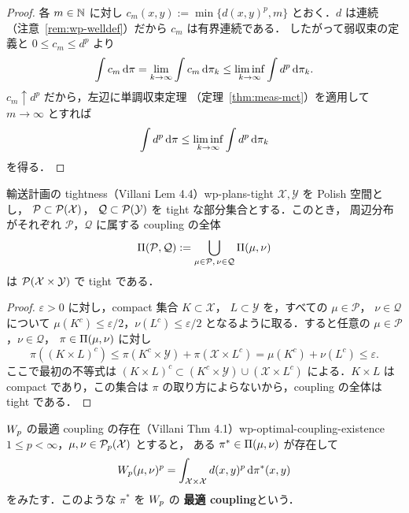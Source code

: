 \begin{proof}
  各 $m\in\mathbb{N}$ に対し $c_m(x,y):=\min\{d(x,y)^p,m\}$ とおく．$d$ は連続
  （注意~\ref{rem:wp-welldef}）だから $c_m$ は有界連続である．
  したがって弱収束の定義と $0\leq c_m\leq d^p$ より
  \[
    \int c_m\,\mathrm{d}\pi
    =\lim_{k\to\infty}\int c_m\,\mathrm{d}\pi_k
    \leq\liminf_{k\to\infty}\int d^p\,\mathrm{d}\pi_k.
  \]
  $c_m\uparrow d^p$ だから，左辺に単調収束定理
  （定理~\ref{thm:meas-mct}）を適用して $m\to\infty$ とすれば
  \[
    \int d^p\,\mathrm{d}\pi
    \leq\liminf_{k\to\infty}\int d^p\,\mathrm{d}\pi_k
  \]
  を得る．
\end{proof}

\begin{lemma}{輸送計画の tightness（Villani Lem 4.4）}{wp-plans-tight}
  $\mathcal{X},\mathcal{Y}$ を Polish 空間とし，
  $\mathcal{P}\subset\mathcal{P}(\mathcal{X})$，
  $\mathcal{Q}\subset\mathcal{P}(\mathcal{Y})$ を
  tight な部分集合とする．このとき，
  周辺分布がそれぞれ $\mathcal{P}$，$\mathcal{Q}$ に属する
  coupling の全体
  \[
    \Pi(\mathcal{P},\mathcal{Q})
    :=\bigcup_{\mu\in\mathcal{P},\,\nu\in\mathcal{Q}}
    \Pi(\mu,\nu)
  \]
  は $\mathcal{P}(\mathcal{X}\times\mathcal{Y})$ で tight である．
\end{lemma}

\begin{proof}
  $\varepsilon>0$ に対し，compact 集合 $K\subset\mathcal{X}$，
  $L\subset\mathcal{Y}$ を，すべての $\mu\in\mathcal{P}$，
  $\nu\in\mathcal{Q}$ について
  $\mu(K^c)\leq\varepsilon/2$，$\nu(L^c)\leq\varepsilon/2$
  となるように取る．すると任意の $\mu\in\mathcal{P}$，$\nu\in\mathcal{Q}$，
  $\pi\in\Pi(\mu,\nu)$ に対し
  \[
    \pi((K\times L)^c)
    \leq
    \pi(K^c\times\mathcal{Y})+\pi(\mathcal{X}\times L^c)
    =\mu(K^c)+\nu(L^c)\leq\varepsilon.
  \]
  ここで最初の不等式は
  $(K\times L)^c\subset(K^c\times\mathcal{Y})\cup(\mathcal{X}\times L^c)$
  による．$K\times L$ は compact であり，この集合は
  $\pi$ の取り方によらないから，coupling の全体は tight である．
\end{proof}

\begin{theorem}{$W_p$ の最適 coupling の存在（Villani Thm 4.1）}{wp-optimal-coupling-existence}
  $1\leq p<\infty$，$\mu,\nu\in\mathcal{P}_{p}(\mathcal{X})$ とすると，
  ある $\pi^*\in\Pi(\mu,\nu)$ が存在して
  \[
    W_p(\mu,\nu)^p
    =
    \int_{\mathcal{X}\times \mathcal{X}}d(x,y)^p\,\mathrm{d}\pi^*(x,y)
  \]
  をみたす．このような $\pi^*$ を $W_p$ の
  \textbf{最適 coupling}という．
\end{theorem}

